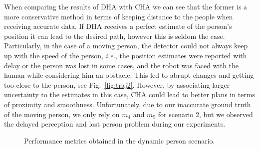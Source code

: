 When comparing the results of DHA with CHA we can see that the former is a more conservative method in terms of keeping distance to the people when receiving accurate data. If DHA receives a perfect estimate of the person's position it can lead to the desired path, however this is seldom the case. Particularly, in the case of a moving person, the detector could not always keep up with the speed of the person, \textit{i.e.}, the position estimates were reported with delay or the person was lost in some cases, and the robot was faced with the human while considering him an obstacle. This led to abrupt changes and getting too close to the person, see Fig.~\ref{fig:traj2}. However, by associating larger uncertainty to the estimates in this case, CHA could lead to better plans in terms of proximity and smoothness. Unfortunately, due to our inaccurate ground truth of the moving person, we only rely on $m_{4}$ and $m_{5}$ for scenario 2, but we observed the delayed perception and lost person problem during our experiments. 




\begin{figure}
\centering
{}%
\hspace{0.1cm}
%

\caption{Performance metrics obtained in the dynamic person scenario. %
}
\label{fig:boxplots_singlePersonMov}
\end{figure}

